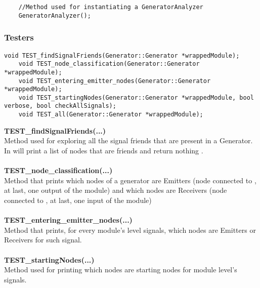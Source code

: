 \documentclass{article}
\begin{document}
\begin{mdframed}[hidealllines=true, backgroundcolor=magenta!10]
	\begin{lstlisting}
	//Method used for instantiating a GeneratorAnalyzer
	GeneratorAnalyzer();
	\end{lstlisting}
\end{mdframed}

\subsubsection{Testers}

\begin{mdframed}[hidealllines=true, backgroundcolor=magenta!10]
	\begin{lstlisting}[basicstyle=\tiny]
	void TEST_findSignalFriends(Generator::Generator *wrappedModule);
	void TEST_node_classification(Generator::Generator *wrappedModule);
	void TEST_entering_emitter_nodes(Generator::Generator *wrappedModule);
	void TEST_startingNodes(Generator::Generator *wrappedModule, bool verbose, bool checkAllSignals);
	void TEST_all(Generator::Generator *wrappedModule);
	\end{lstlisting}
\end{mdframed}

\textbf{TEST\_findSignalFriends(...)}\\
Method used for exploring all the signal friends that are present in a Generator.\\
In will print a list of nodes that are friends and return nothing .\\\\

\textbf{TEST\_node\_classification(...)}\\
Method that prints which nodes of a generator are Emitters (node connected to , at last, one output of the module) and which nodes are Receivers (node connected to , at last, one input of the module)\\\\

\textbf{TEST\_entering\_emitter\_nodes(...)}\\
Method that prints, for every module's level signals, which nodes are Emitters or Receivers for such signal.\\\\

\textbf{TEST\_startingNodes(...)}\\
Method used for printing which nodes are starting nodes for module level's signals.\\\\
\end{document}
